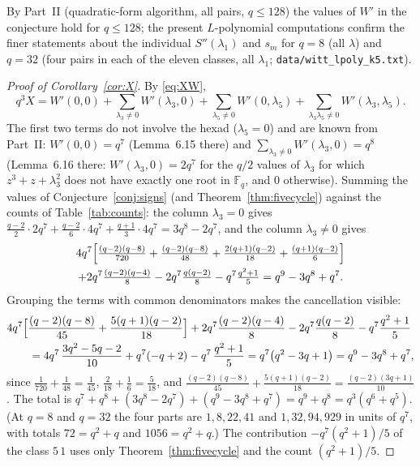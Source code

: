 \documentclass[12pt,a4paper]{amsart}
\theoremstyle{definition}
\newcommand{\F}{\mathbb{F}}
\newcommand{\Spp}{S''}
\begin{document}
By Part~II (quadratic-form algorithm, all pairs, $q\le128$) the values of $W'$ in the conjecture hold for $q\le128$; the present $L$-polynomial computations confirm the finer statements about the individual $\Spp(\lambda_1)$ and $s_m$ for $q=8$ (all $\lambda$) and $q=32$ (four pairs in each of the eleven classes, all $\lambda_1$; \texttt{data/witt\_lpoly\_k5.txt}).

\begin{proof}[Proof of Corollary~\ref{cor:X}]
By \eqref{eq:XW},
\[
q^3X=W'(0,0)+\sum_{\lambda_3\ne0}W'(\lambda_3,0)+\sum_{\lambda_5\ne0}W'(0,\lambda_5)+\sum_{\lambda_3\lambda_5\ne0}W'(\lambda_3,\lambda_5).
\]
The first two terms do not involve the hexad ($\lambda_5=0$) and are known from Part~II: $W'(0,0)=q^7$ (Lemma~6.15 there) and $\sum_{\lambda_3\ne0}W'(\lambda_3,0)=q^8$ (Lemma~6.16 there: $W'(\lambda_3,0)=2q^7$ for the $q/2$ values of $\lambda_3$ for which $z^3+z+\lambda_3^2$ does not have exactly one root in $\F_q$, and $0$ otherwise). Summing the values of Conjecture~\ref{conj:signs} (and Theorem~\ref{thm:fivecycle}) against the counts of Table~\ref{tab:counts}: the column $\lambda_3=0$ gives $\frac{q-2}2\cdot2q^7+\frac{q-2}6\cdot4q^7+\frac{q+1}3\cdot4q^7=3q^8-2q^7$, and the column $\lambda_3\ne0$ gives
\begin{multline*}
4q^7\Bigl[\tfrac{(q-2)(q-8)}{720}+\tfrac{(q-2)(q-8)}{48}+\tfrac{2(q+1)(q-2)}{18}+\tfrac{(q+1)(q-2)}6\Bigr]\\
+2q^7\tfrac{(q-2)(q-4)}8-2q^7\tfrac{q(q-2)}8-q^7\tfrac{q^2+1}5=q^9-3q^8+q^7 .
\end{multline*}
Grouping the terms with common denominators makes the cancellation visible:
\begin{align*}
&4q^7\Bigl[\frac{(q-2)(q-8)}{45}+\frac{5(q+1)(q-2)}{18}\Bigr]+2q^7\frac{(q-2)(q-4)}8-2q^7\frac{q(q-2)}8-q^7\frac{q^2+1}5\\
&\qquad=4q^7\,\frac{3q^2-5q-2}{10}+q^7(-q+2)-q^7\,\frac{q^2+1}5=q^7\bigl(q^2-3q+1\bigr)=q^9-3q^8+q^7 ,
\end{align*}
since $\frac1{720}+\frac1{48}=\frac1{45}$, $\frac2{18}+\frac16=\frac5{18}$, and $\frac{(q-2)(q-8)}{45}+\frac{5(q+1)(q-2)}{18}=\frac{(q-2)(3q+1)}{10}$. The total is $q^7+q^8+(3q^8-2q^7)+(q^9-3q^8+q^7)=q^9+q^8=q^3(q^6+q^5)$. (At $q=8$ and $q=32$ the four parts are $1,8,22,41$ and $1,32,94,929$ in units of $q^7$, with totals $72=q^2+q$ and $1056=q^2+q$.) The contribution $-q^7(q^2+1)/5$ of the class $5\,1$ uses only Theorem~\ref{thm:fivecycle} and the count $(q^2+1)/5$.
\end{proof}
\end{document}
